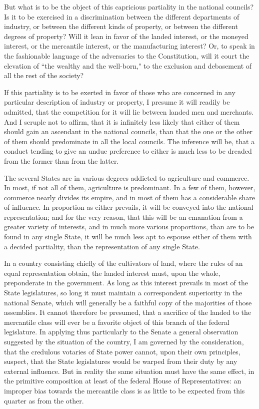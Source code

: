 But what is to be the object of this capricious partiality in the national councils? 
Is it to be exercised in a discrimination between the different departments of industry, or between the different kinds of property, or between the different degrees of property? 
Will it lean in favor of the landed interest, or the moneyed interest, or the mercantile interest, or the manufacturing interest? 
Or, to speak in the fashionable language of the adversaries to the Constitution, will it court the elevation of ``the wealthy and the well-born," to the exclusion and debasement of all the rest of the society?

If this partiality is to be exerted in favor of those who are concerned in any particular description of industry or property, I presume it will readily be admitted, that the competition for it will lie between landed men and merchants. 
And I scruple not to affirm, that it is infinitely less likely that either of them should gain an ascendant in the national councils, than that the one or the other of them should predominate in all the local councils. 
The inference will be, that a conduct tending to give an undue preference to either is much less to be dreaded from the former than from the latter.

The several States are in various degrees addicted to agriculture and commerce. 
In most, if not all of them, agriculture is predominant. 
In a few of them, however, commerce nearly divides its empire, and in most of them has a considerable share of influence. 
In proportion as either prevails, it will be conveyed into the national representation; and for the very reason, that this will be an emanation from a greater variety of interests, and in much more various proportions, than are to be found in any single State, it will be much less apt to espouse either of them with a decided partiality, than the representation of any single State.

In a country consisting chiefly of the cultivators of land, where the rules of an equal representation obtain, the landed interest must, upon the whole, preponderate in the government. 
As long as this interest prevails in most of the State legislatures, so long it must maintain a correspondent superiority in the national Senate, which will generally be a faithful copy of the majorities of those assemblies. 
It cannot therefore be presumed, that a sacrifice of the landed to the mercantile class will ever be a favorite object of this branch of the federal legislature. 
In applying thus particularly to the Senate a general observation suggested by the situation of the country, I am governed by the consideration, that the credulous votaries of State power cannot, upon their own principles, suspect, that the State legislatures would be warped from their duty by any external influence. 
But in reality the same situation must have the same effect, in the primitive composition at least of the federal House of Representatives: an improper bias towards the mercantile class is as little to be expected from this quarter as from the other.

